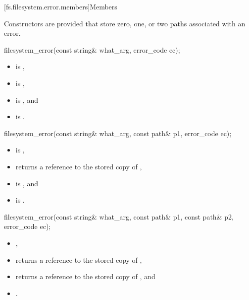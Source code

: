 [fs.filesystem.error.members]{Members}

\pnum
 Constructors are provided that store zero, one, or two paths associated with
an error.

%
\begin{itemdecl}
filesystem_error(const string& what_arg, error_code ec);
\end{itemdecl}

\begin{itemdescr}
\pnum
\ensures
\begin{itemize}
\item {} is ,
\item {} is ,
\item {} is , and
\item {}  is .
\end{itemize}
\end{itemdescr}

%
\begin{itemdecl}
filesystem_error(const string& what_arg, const path& p1, error_code ec);
\end{itemdecl}

\begin{itemdescr}
\pnum
\ensures
\begin{itemize}
\item {} is ,
\item {} returns a reference to the stored copy of ,
\item {} is , and
\item {}  is .
\end{itemize}
\end{itemdescr}

%
\begin{itemdecl}
filesystem_error(const string& what_arg, const path& p1, const path& p2, error_code ec);
\end{itemdecl}

\begin{itemdescr}
\pnum
\ensures
\begin{itemize}
\item {},
\item {} returns a reference to the stored copy of ,
\item {} returns a reference to the stored copy of , and
\item {} .
\end{itemize}
\end{itemdescr}

